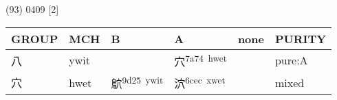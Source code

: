 \documentclass[14pt,a4paper]{scrartcl}
\begin{document}
(93) 0409 {[}2{]}

\begin{longtable}[c]{@{}llllll@{}}
\toprule
\begin{minipage}[b]{0.14\columnwidth}\raggedright\strut
GROUP
\strut\end{minipage} &
\begin{minipage}[b]{0.14\columnwidth}\raggedright\strut
MCH
\strut\end{minipage} &
\begin{minipage}[b]{0.14\columnwidth}\raggedright\strut
B
\strut\end{minipage} &
\begin{minipage}[b]{0.14\columnwidth}\raggedright\strut
A
\strut\end{minipage} &
\begin{minipage}[b]{0.14\columnwidth}\raggedright\strut
none
\strut\end{minipage} &
\begin{minipage}[b]{0.14\columnwidth}\raggedright\strut
PURITY
\strut\end{minipage}\tabularnewline
\midrule
\endhead
\begin{minipage}[t]{0.14\columnwidth}\raggedright\strut
八
\strut\end{minipage} &
\begin{minipage}[t]{0.14\columnwidth}\raggedright\strut
ywit
\strut\end{minipage} &
\begin{minipage}[t]{0.14\columnwidth}\raggedright\strut
\strut\end{minipage} &
\begin{minipage}[t]{0.14\columnwidth}\raggedright\strut
穴\textsuperscript{7a74~hwet}
\strut\end{minipage} &
\begin{minipage}[t]{0.14\columnwidth}\raggedright\strut
\strut\end{minipage} &
\begin{minipage}[t]{0.14\columnwidth}\raggedright\strut
pure:A
\strut\end{minipage}\tabularnewline
\begin{minipage}[t]{0.14\columnwidth}\raggedright\strut
穴
\strut\end{minipage} &
\begin{minipage}[t]{0.14\columnwidth}\raggedright\strut
hwet
\strut\end{minipage} &
\begin{minipage}[t]{0.14\columnwidth}\raggedright\strut
鴥\textsuperscript{9d25~ywit}
\strut\end{minipage} &
\begin{minipage}[t]{0.14\columnwidth}\raggedright\strut
泬\textsuperscript{6cec~xwet}
\strut\end{minipage} &
\begin{minipage}[t]{0.14\columnwidth}\raggedright\strut
\strut\end{minipage} &
\begin{minipage}[t]{0.14\columnwidth}\raggedright\strut
mixed
\strut\end{minipage}\tabularnewline
\bottomrule
\end{longtable}
\end{document}
